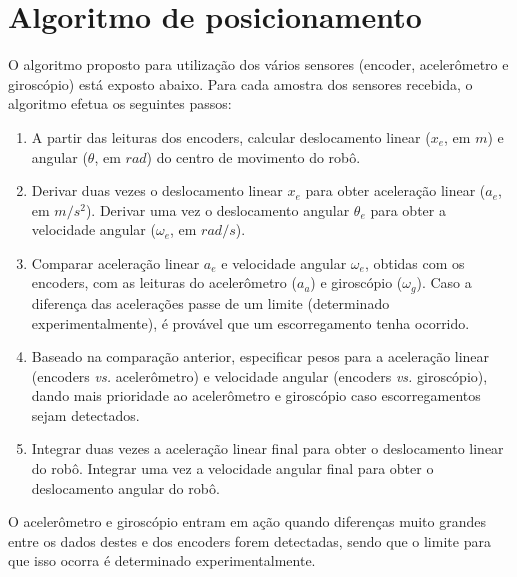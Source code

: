 \section{Algoritmo de posicionamento}

O algoritmo proposto para utilização dos vários sensores (encoder, acelerômetro e giroscópio) está exposto abaixo. Para cada amostra dos sensores recebida, o algoritmo efetua os seguintes passos:

\begin{enumerate}
      \item A partir das leituras dos encoders, calcular deslocamento linear ($x_e$, em $m$) e angular ($\theta$, em $rad$) do centro de movimento do robô.
      \item Derivar duas vezes o deslocamento linear $x_e$ para obter aceleração linear ($a_e$, em $m/s^2$). Derivar uma vez o deslocamento angular $\theta_e$ para obter a velocidade angular ($\omega_e$, em $rad/s$).
      \item Comparar aceleração linear $a_e$ e velocidade angular $\omega_e$, obtidas com os encoders, com as leituras do acelerômetro ($a_a$) e giroscópio ($\omega_g$). Caso a diferença das acelerações passe de um limite (determinado experimentalmente), é provável que um escorregamento tenha ocorrido.
      \item Baseado na comparação anterior, especificar pesos para a aceleração linear (encoders \textit{vs.} acelerômetro) e velocidade angular (encoders \textit{vs.} giroscópio), dando mais prioridade ao acelerômetro e giroscópio caso escorregamentos sejam detectados.
      \item Integrar duas vezes a aceleração linear final para obter o deslocamento linear do robô. Integrar uma vez a velocidade angular final para obter o deslocamento angular do robô.
\end{enumerate}


O acelerômetro e giroscópio entram em ação quando diferenças muito grandes entre os dados destes e dos encoders forem detectadas, sendo que o limite para que isso ocorra é determinado experimentalmente.

